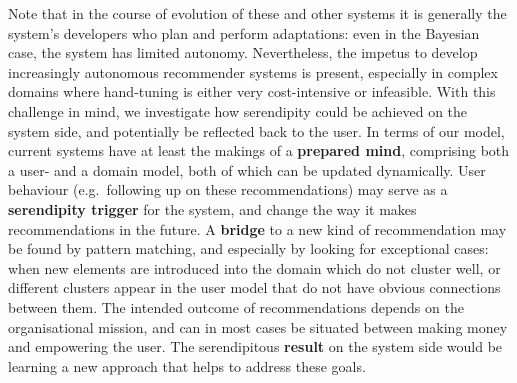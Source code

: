 Note that in the course of evolution of these and other systems it is generally the system's developers who plan and perform adaptations: even in the Bayesian case, the system has limited autonomy. Nevertheless, the impetus to develop increasingly autonomous recommender systems is present, especially in complex domains where hand-tuning is either very cost-intensive or infeasible.  With this challenge in mind, we investigate how serendipity could be achieved on the system side, and potentially be reflected back to the user. In terms of our model, current systems have at least the makings of a \textbf{prepared mind}, comprising both a user- and a domain model, both of which can be updated dynamically. User behaviour (e.g.~following up on these recommendations) may serve as a \textbf{serendipity trigger} for the system, and change the way it makes recommendations in the future. A \textbf{bridge} to a new kind of recommendation may be found by pattern matching, and especially by looking for exceptional cases: when new elements are introduced into the domain which do not cluster well, or different clusters appear in the user model that do not have obvious connections between them. The intended outcome of recommendations depends on the organisational mission, and can in most cases be situated between making money and empowering the user. The serendipitous \textbf{result} on the system side would be learning a new approach that helps to address these goals.

